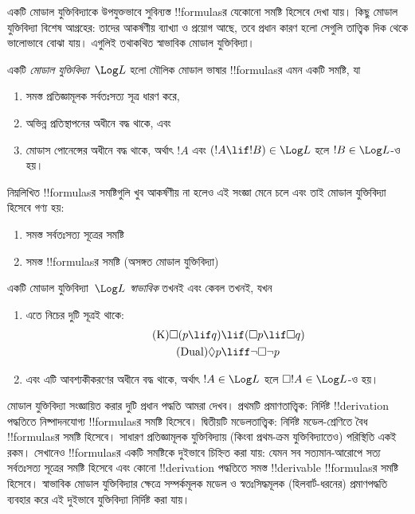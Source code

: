 \documentclass[../../../include/open-logic-section]{subfiles}
\begin{document}


একটি মোডাল যুক্তিবিদ্যাকে উপযুক্তভাবে সুবিন্যস্ত !!{formula}sর যেকোনো
সমষ্টি হিসেবে দেখা যায়। কিছু মোডাল যুক্তিবিদ্যা বিশেষ আগ্রহের: তাদের
আকর্ষণীয় ব্যাখ্যা ও প্রয়োগ আছে, তবে প্রধান কারণ হলো সেগুলি তাত্ত্বিক
দিক থেকে ভালোভাবে বোঝা যায়। এগুলিই তথাকথিত স্বাভাবিক মোডাল
যুক্তিবিদ্যা।

\begin{defn}
একটি \emph{মোডাল যুক্তিবিদ্যা}~$\Log L$ হলো মৌলিক মোডাল ভাষার
!!{formula}sর এমন একটি সমষ্টি, যা
\begin{enumerate}
\item সমস্ত প্রতিজ্ঞামূলক সর্বতঃসত্য সূত্র ধারণ করে,
\item অভিন্ন প্রতিস্থাপনের অধীনে বদ্ধ থাকে, এবং
\item মোডাস পোনেন্সের অধীনে বদ্ধ থাকে, অর্থাৎ $!A$ এবং $(!A \lif
  !B) \in \Log L$ হলে $!B \in \Log L$-ও হয়।
\end{enumerate}
\end{defn}

\begin{ex}
নিম্নলিখিত !!{formula}sর সমষ্টিগুলি খুব আকর্ষণীয় না হলেও এই
সংজ্ঞা মেনে চলে এবং তাই মোডাল যুক্তিবিদ্যা হিসেবে গণ্য হয়:
\begin{enumerate}
\item সমস্ত সর্বতঃসত্য সূত্রের সমষ্টি
\item সমস্ত !!{formula}sর সমষ্টি (অসঙ্গত মোডাল যুক্তিবিদ্যা)
\end{enumerate}
\end{ex}

\begin{defn}\label{defn:normal-modal-logic}
একটি মোডাল যুক্তিবিদ্যা~$\Log L$ \emph{স্বাভাবিক} তখনই এবং কেবল
তখনই, যখন
\begin{enumerate}
\item এতে নিচের দুটি সূত্রই থাকে:
\begin{align}
\tag{K} \Box(p \lif q) & \lif (\Box p \lif \Box q) \\
\tag{Dual} \Diamond p & \liff \lnot \Box \lnot p
\end{align}
\item এবং এটি আবশ্যকীকরণের অধীনে বদ্ধ থাকে, অর্থাৎ $!A \in
  \Log L$ হলে $\Box !A \in \Log L$-ও হয়।
\end{enumerate}
\end{defn}

মোডাল যুক্তিবিদ্যা সংজ্ঞায়িত করার দুটি প্রধান পদ্ধতি আমরা দেখব।
প্রথমটি প্রমাণতাত্ত্বিক: নির্দিষ্ট !!{derivation} পদ্ধতিতে
নিষ্পাদনযোগ্য !!{formula}sর সমষ্টি হিসেবে। দ্বিতীয়টি মডেলতাত্ত্বিক:
নির্দিষ্ট মডেল-শ্রেণিতে বৈধ !!{formula}sর সমষ্টি হিসেবে। সাধারণ
প্রতিজ্ঞামূলক যুক্তিবিদ্যায় (কিংবা প্রথম-ক্রম যুক্তিবিদ্যাতেও)
পরিস্থিতি একই রকম। সেখানেও !!{formula}sর একটি সমষ্টিকে দুইভাবে
চিহ্নিত করা যায়: যেমন সব সত্যমান-আরোপে সত্য সর্বতঃসত্য সূত্রের
সমষ্টি হিসেবে এবং কোনো !!{derivation} পদ্ধতিতে সমস্ত !!{derivable}
!!{formula}sর সমষ্টি হিসেবে। স্বাভাবিক মোডাল যুক্তিবিদ্যার ক্ষেত্রে
সম্পর্কমূলক মডেল ও স্বতঃসিদ্ধমূলক (হিলবার্ট-ধরনের) প্রমাণপদ্ধতি
ব্যবহার করে এই দুইভাবে যুক্তিবিদ্যা নির্দিষ্ট করা যায়।
\end{document}
